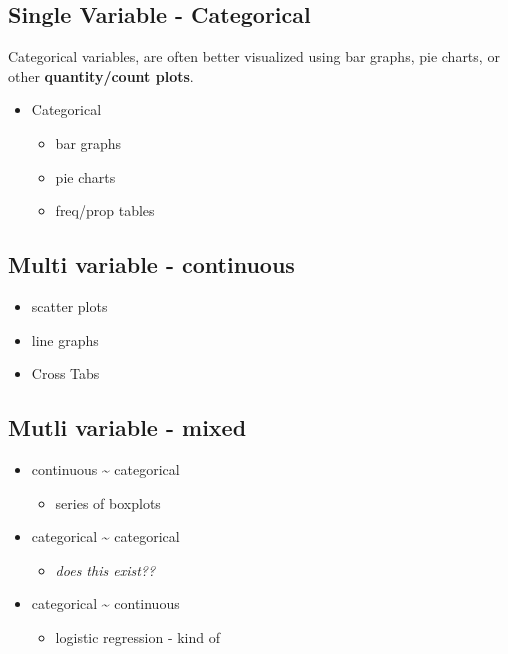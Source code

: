 \documentclass[
]{book}
\providecommand{\tightlist}{%
  \setlength{\itemsep}{0pt}\setlength{\parskip}{0pt}}
\begin{document}
\hypertarget{single-variable---categorical}{%
\subsection{Single Variable - Categorical}\label{single-variable---categorical}}

Categorical variables, are often better visualized using bar graphs, pie charts, or other \textbf{quantity/count plots}.

\begin{itemize}
\tightlist
\item
  Categorical

  \begin{itemize}
  \tightlist
  \item
    bar graphs
  \item
    pie charts
  \item
    freq/prop tables
  \end{itemize}
\end{itemize}

\hypertarget{multi-variable---continuous}{%
\subsection{Multi variable - continuous}\label{multi-variable---continuous}}

\begin{itemize}
\tightlist
\item
  scatter plots
\item
  line graphs
\item
  Cross Tabs
\end{itemize}

\hypertarget{mutli-variable---mixed}{%
\subsection{Mutli variable - mixed}\label{mutli-variable---mixed}}

\begin{itemize}
\tightlist
\item
  continuous \textasciitilde{} categorical

  \begin{itemize}
  \tightlist
  \item
    series of boxplots
  \end{itemize}
\item
  categorical \textasciitilde{} categorical

  \begin{itemize}
  \tightlist
  \item
    \emph{does this exist??}
  \end{itemize}
\item
  categorical \textasciitilde{} continuous

  \begin{itemize}
  \tightlist
  \item
    logistic regression - kind of
  \end{itemize}
\end{itemize}
\end{document}
